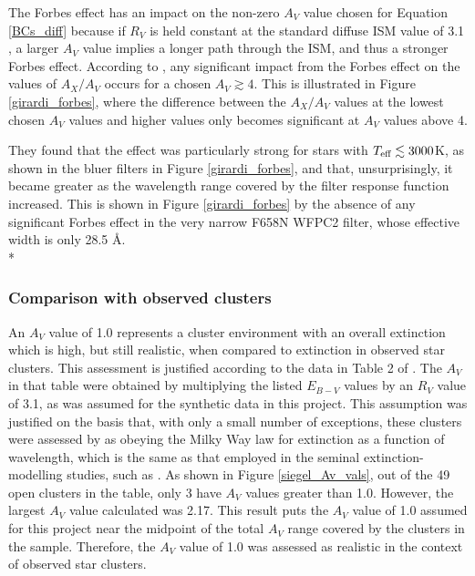 \documentclass[12pt, a4paper]{report}
\begin{document}
The Forbes effect has an impact on the non-zero $A_{V}$ value chosen for Equation \ref{BCs_diff} because if $R_{V}$ is held constant at the standard diffuse ISM value of 3.1 \citep{1989ApJ...345..245C}, a larger $A_{V}$ value implies a longer path through the ISM, and thus a stronger Forbes effect. According to \cite{2008PASP..120..583G}, any significant impact from the Forbes effect on the values of $A_{X}/A_{V}$ occurs for a chosen $A_{V} \gtrsim 4$. This is illustrated in Figure \ref{girardi_forbes}, where the difference between the $A_{X}/A_{V}$ values at the lowest chosen $A_{V}$ values and higher values only becomes significant at $A_{V}$ values above 4.

They found that the effect was particularly strong for stars with $T_{\textnormal{eff}} \lesssim 3000$K, as shown in the bluer filters in Figure \ref{girardi_forbes},  and that, unsurprisingly, it became greater as the wavelength range covered by the filter response function increased. This is shown in Figure \ref{girardi_forbes} by the absence of any significant Forbes effect in the very narrow F658N WFPC2 filter, whose effective width is only 28.5 \AA \citep{2008wfpi.book.....M}.\\*

\subsubsection{Comparison with observed clusters}

An $A_{V}$ value of 1.0 represents a cluster environment with an overall extinction which is high, but still realistic, when compared to extinction in observed star clusters. This assessment is justified according to the data in Table 2 of \cite{2019AJ....158...35S}. The $A_{V}$ in that table were obtained by multiplying the listed $E_{B-V}$ values by an $R_{V}$ value of 3.1, as was assumed for the synthetic data in this project. This assumption was justified on the basis that, with only a small number of exceptions, these clusters were assessed by \cite{2019AJ....158...35S} as obeying the Milky Way law for extinction as a function of wavelength, which is the same as that employed in the seminal extinction-modelling studies, such as \cite{1989ApJ...345..245C}. As shown in Figure \ref{siegel_Av_vals}, out of the 49 open clusters in the table, only 3 have $A_{V}$ values greater than 1.0. However, the largest $A_{V}$ value calculated was 2.17. This result puts the $A_{V}$ value of 1.0 assumed for this project near the midpoint of the total $A_{V}$ range covered by the clusters in the \cite{2019AJ....158...35S} sample. Therefore, the $A_{V}$ value of 1.0 was assessed as realistic in the context of observed star clusters.
\end{document}
